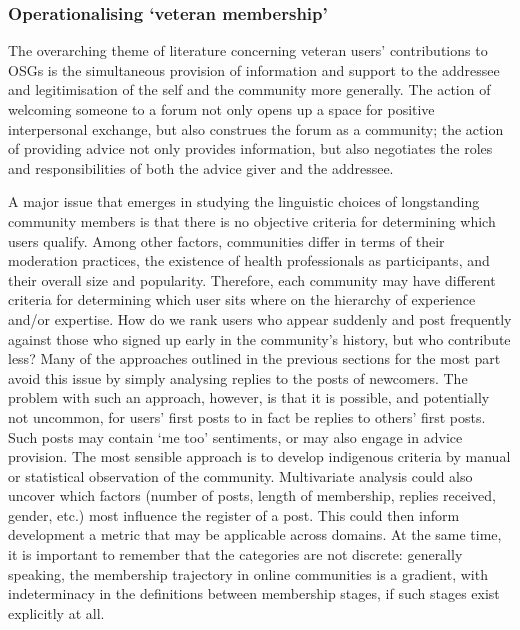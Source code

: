 
\subsubsection{Operationalising `veteran membership'} \label{sect:operat-vets}

The overarching theme of literature concerning veteran users' contributions to \glspl{OSG} is the simultaneous provision of information and support to the addressee and legitimisation of the self and the community more generally. The action of welcoming someone to a \gls{forum} not only opens up a space for positive interpersonal exchange, but also construes the \gls{forum} as a community; the action of providing advice not only provides information, but also negotiates the roles and responsibilities of both the advice giver and the addressee.

A major issue that emerges in studying the linguistic choices of longstanding community members is that there is no objective criteria for determining which users qualify. Among other factors, communities differ in terms of their moderation practices, the existence of health professionals as participants, and their overall size and popularity. Therefore, each community may have different criteria for determining which user sits where on the hierarchy of experience and\slash or expertise. How do we rank users who appear suddenly and post frequently against those who signed up early in the community's history, but who contribute less? Many of the approaches outlined in the previous sections for the most part avoid this issue by simply analysing replies to the posts of newcomers. The problem with such an approach, however, is that it is possible, and potentially not uncommon, for users' first \glspl{post} to in fact be replies to others' first \glspl{post}. Such posts may contain `me too' sentiments, or may also engage in advice provision. The most sensible approach is to develop indigenous criteria by manual or statistical observation of the community. Multivariate analysis could also uncover which factors (number of posts, length of membership, replies received, gender, etc.) most influence the register of a post. This could then inform development a metric that may be applicable across domains. At the same time, it is important to remember that the categories are not discrete: generally speaking, the membership trajectory in online communities is a gradient, with indeterminacy in the definitions between membership stages, if such stages exist explicitly at all.

